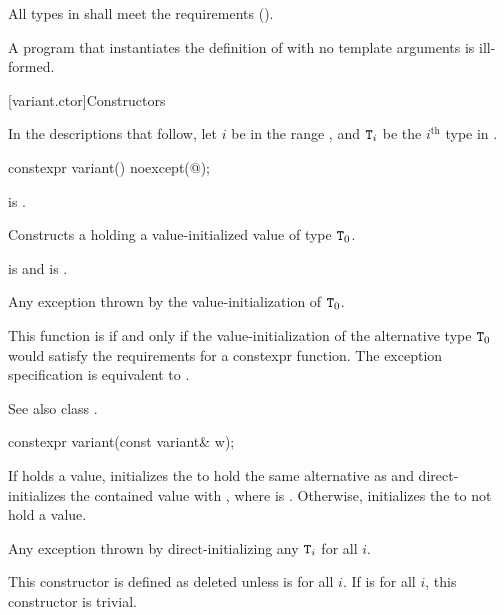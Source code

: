 \pnum
All types in  shall meet
the  requirements ().

\pnum
A program that instantiates the definition of  with
no template arguments is ill-formed.

[variant.ctor]{Constructors}

\pnum
In the descriptions that follow, let $i$ be in the range ,
and $\texttt{T}_i$ be the $i^\text{th}$ type in .

%
\begin{itemdecl}
constexpr variant() noexcept(@\seebelow@);
\end{itemdecl}

\begin{itemdescr}
\pnum
\constraints
{} is .

\pnum
\effects
Constructs a  holding a value-initialized value of type $\texttt{T}_0$.

\pnum
\ensures
{} is  and  is .

\pnum
\throws
Any exception thrown by the value-initialization of $\texttt{T}_0$.

\pnum
\remarks
This function is  if and only if the
value-initialization of the alternative type $\texttt{T}_0$ would satisfy the
requirements for a constexpr function.
The exception specification is equivalent to
.
\begin{note}
See also class .
\end{note}
\end{itemdescr}

%
\begin{itemdecl}
constexpr variant(const variant& w);
\end{itemdecl}

\begin{itemdescr}
\pnum
\effects
If  holds a value, initializes the  to hold the same
alternative as  and direct-initializes the contained value
with , where  is .
Otherwise, initializes the  to not hold a value.

\pnum
\throws
Any exception thrown by direct-initializing any $\texttt{T}_i$ for all $i$.

\pnum
\remarks
This constructor is defined as deleted unless
 is  for all $i$.
If 
is  for all $i$, this constructor is trivial.
\end{itemdescr}

